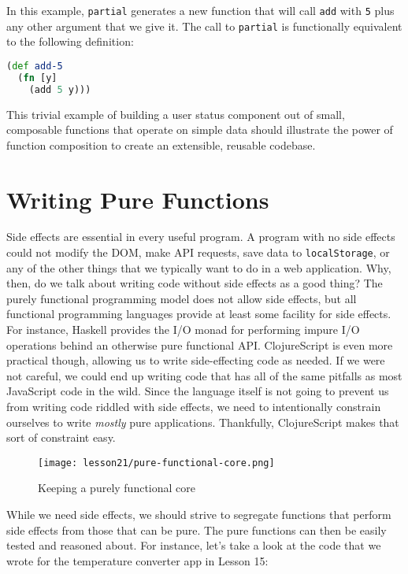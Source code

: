 \documentclass[10pt,twoside,openright]{memoir}
\begin{document}
In this example, \texttt{partial} generates a new function that will
call \texttt{add} with \texttt{5} plus any other argument that we give
it. The call to \texttt{partial} is functionally equivalent to the
following definition:

\begin{lstlisting}[language=Clojure]
(def add-5
  (fn [y]
    (add 5 y)))
\end{lstlisting}

This trivial example of building a user status component out of small,
composable functions that operate on simple data should illustrate the
power of function composition to create an extensible, reusable
codebase.


\section{Writing Pure Functions}

Side effects are essential in every useful program. A program with no
side effects could not modify the DOM, make API requests, save data to
\texttt{localStorage}, or any of the other things that we typically want
to do in a web application. Why, then, do we talk about writing code
without side effects as a good thing? The purely functional programming
model does not allow side effects, but all functional programming
languages provide at least some facility for side effects. For instance,
Haskell provides the I/O monad for performing impure I/O operations behind
an otherwise pure functional API. ClojureScript is even more practical
though, allowing us to write side-effecting code as needed. If we were
not careful, we could end up writing code that has all of the same
pitfalls as most JavaScript code in the wild. Since the language itself
is not going to prevent us from writing code riddled with side effects,
we need to intentionally constrain ourselves to write \emph{mostly} pure
applications. Thankfully, ClojureScript makes that sort of constraint
easy.

\begin{figure}[H]
\caption{Keeping a purely functional core}
\centering
\texttt{[image: lesson21/pure-functional-core.png]}
\end{figure}

While we need side effects, we should strive to segregate functions that
perform side effects from those that can be pure. The pure functions can
then be easily tested and reasoned about. For instance, let's take a
look at the code that we wrote for the temperature converter app in
Lesson 15:
\end{document}
